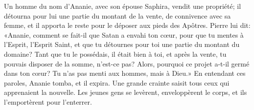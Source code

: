 Un homme du nom d’Ananie, avec son épouse Saphira, vendit une propriété;
	il détourna pour lui une partie du montant de la vente,
	de connivence avec sa femme,
	et il apporta le reste pour le déposer aux pieds des Apôtres.
Pierre lui dit: «Ananie, comment se fait-il que Satan a envahi ton cœur,
	pour que tu mentes à l’Esprit, l’Esprit Saint,
	et que tu détournes pour toi une partie du montant du domaine?
Tant que tu le possédais, il était bien à toi,
	et après la vente, tu pouvais disposer de la somme, n’est-ce pas?
	Alors, pourquoi ce projet a-t-il germé dans ton cœur?
	Tu n’as pas menti aux hommes, mais à Dieu.»
En entendant ces paroles, Ananie tomba, et il expira.
Une grande crainte saisit tous ceux qui apprenaient la nouvelle.
Les jeunes gens se levèrent, enveloppèrent le corps,
	et ils l’emportèrent pour l’enterrer.
